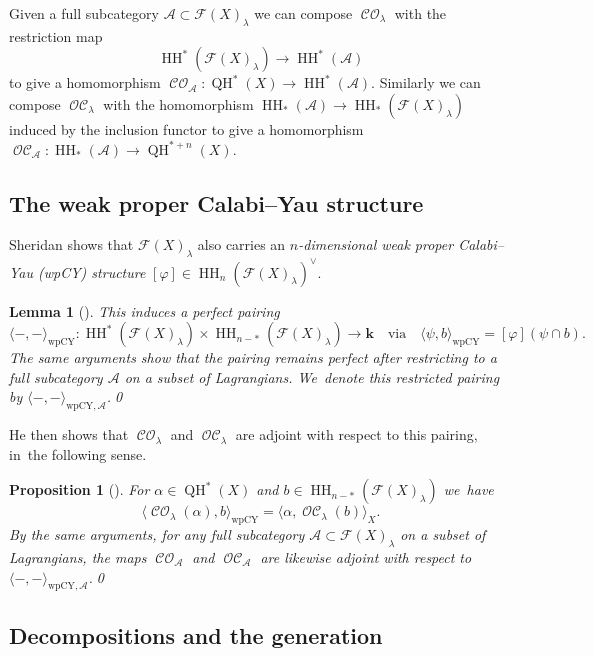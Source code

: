 \documentclass[JEP,XML,SOM,Unicode,NoEqCountersInSection,NoFloatCountersInSection,published]{cedram}
\newtheorem{lemma}[theorem]{Lemma}
\newtheorem{proposition}[theorem]{Proposition}
\theoremstyle{definition}
\let\phi\varphi
\newcommand{\calA}{\mathcal{A}}
\newcommand{\Fuk}{\mathcal{F}}
\newcommand{\kk}{{\boldsymbol{k}}}
\newcommand{\HH}{\operatorname{HH}}
\newcommand{\CO}{\operatorname{\mathcal{CO}}}
\newcommand{\OC}{\operatorname{\mathcal{OC}}}
\newcommand{\QH}{\operatorname{QH}}
\begin{document}
Given a full subcategory $\calA \subset \Fuk(X)_\lambda$ we can compose $\CO_\lambda$ with the restriction map
\[
\HH^*(\Fuk(X)_\lambda) \to \HH^*(\calA)
\]
to give a homomorphism $\CO_\calA : \QH^*(X) \to \HH^*(\calA)$. Similarly we can compose $\OC_\lambda$ with the homomorphism $\HH_*(\calA) \to \HH_*(\Fuk(X)_\lambda)$ induced by the inclusion functor to give a homomorphism $\OC_\calA : \HH_*(\calA) \to \QH^{*+n}(X)$.

\subsection{The weak proper Calabi--Yau structure}
\label{sscwpCY}

Sheridan shows \cite[\S 2.8]{SheridanFano} that $\Fuk(X)_\lambda$ also carries an \emph{$n$-dimensional weak proper Calabi--Yau (wpCY) structure} $[\phi] \in \HH_n(\Fuk(X)_\lambda)^\vee$.

\begin{lemma}[{\cite[Lem.\,A.2]{SheridanFano}}]
\label{lemwpCY}
This induces a perfect pairing
\[
\langle{-}, {-}\rangle_\mathrm{wpCY} : \HH^*(\Fuk(X)_\lambda) \times \HH_{n-*}(\Fuk(X)_\lambda) \to \kk \quad \text{via} \quad \langle \psi, b \rangle_\mathrm{wpCY} = [\phi] (\psi \cap b).
\]
The same arguments show that the pairing remains perfect after restricting to a full subcategory $\calA$ on a subset of Lagrangians. We~denote this restricted pairing by $\langle{-}, {-}\rangle_{\mathrm{wpCY}, \calA}$.\qed
\end{lemma}

He then shows that $\CO_\lambda$ and $\OC_\lambda$ are adjoint with respect to this pairing, in~the following sense.

\begin{proposition}[{\cite[Prop.\,2.6]{SheridanFano}}]
\label{propCOOCduality}
For $\alpha \!\in\! \QH^*(X)$ and $b \!\in\! \HH_{n-*}(\Fuk(X)_\lambda)$ we~have
\[
\langle \CO_\lambda(\alpha), b\rangle_\mathrm{wpCY} = \langle \alpha, \OC_\lambda(b) \rangle_X.
\]
By the same arguments, for any full subcategory $\calA \subset \Fuk(X)_\lambda$ on a subset of Lagrangians, the maps $\CO_\calA$ and $\OC_\calA$ are likewise adjoint with respect to $\langle {-}, {-}\rangle_{\mathrm{wpCY}, \calA}$.\qed
\end{proposition}

\subsection{Decompositions and the generation}
\end{document}
